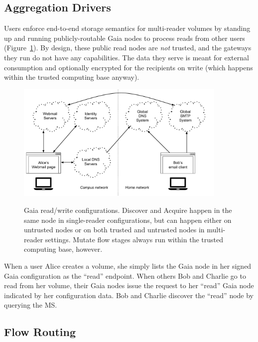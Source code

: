 \subsection{Aggregation Drivers}

Users enforce end-to-end storage semantics for multi-reader volumes by standing up and running
publicly-routable Gaia nodes to process reads from other users
(Figure~\ref{fig:chap3-gaia-reads-writes}).  By design,
these public read nodes are \emph{not} trusted, and the gateways they run do not
have any capabilities.  The data they serve is
meant for external consumption and optionally encrypted for the recipients on
write (which happens within the trusted computing base anyway).

\begin{figure}[h]
   \caption{Gaia read/write configurations.  Discover and Acquire happen in the
   same node in single-reader configurations, but can happen either on untrusted
   nodes or on both trusted and untrusted nodes in multi-reader settings.
   Mutate flow stages always run within the trusted computing base, however.}
   \centering
   \includegraphics[width=0.9\textwidth,page=19]{figures/dissertation-figures}
   \label{fig:chap3-gaia-reads-writes}
\end{figure}

When a user Alice creates a volume, she simply lists the Gaia node
in her signed Gaia configuration as the ``read'' endpoint.  When others Bob and Charlie go to
read from her volume, their Gaia nodes issue the request to her ``read'' Gaia node
indicated by her configuration data.  Bob and Charlie discover the ``read'' node 
by querying the MS.

\subsection{Flow Routing}

